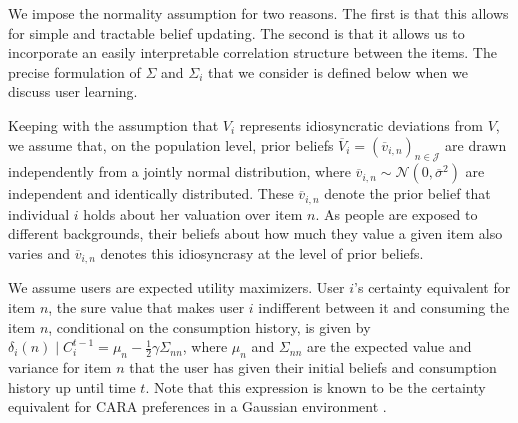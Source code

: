 \documentclass[format=acmsmall, review=false]{acmart}
\begin{document}
We impose the normality assumption for two reasons. The first is that this allows for simple and tractable belief updating. The second is that it allows us to incorporate an easily interpretable correlation structure between the items. The precise formulation of $\Sigma$ and $\Sigma_i$ that we consider is defined below when we discuss user learning.
\par
Keeping with the assumption that $V_i$ represents idiosyncratic deviations from $V$, we assume that, on the population level, prior beliefs $\overline V_i=\left(\overline v_{i,n}\right)_{n \in \mathcal{J}}$ are drawn independently from a jointly normal distribution, where $\overline v_{i,n} \sim \mathcal N (0, \overline \sigma^2)$ are independent and identically distributed. These $\overline v_{i,n}$ denote the prior belief that individual $i$ holds about her valuation over item $n$. As people are exposed to different backgrounds, their beliefs about how much they value a given item also varies and $\overline v_{i,n}$ denotes this idiosyncrasy at the level of prior beliefs.
\par

We assume users are expected utility maximizers. User $i$'s certainty equivalent for item $n$, the sure value that makes user $i$ indifferent between it and consuming the item $n$, conditional on the consumption history, is given by
$\delta_{i}(n)\mid C_i^{t-1}=\mu_n-\frac{1}{2}\gamma \Sigma_{nn}$, where $\mu_n$ and $\Sigma_{nn}$ are the expected value and variance for item $n$ that the user has given their initial beliefs and consumption history up until time $t$. Note that this expression is known to be the certainty equivalent for CARA preferences in a Gaussian environment \cite{mas1995microeconomic}.
\end{document}
